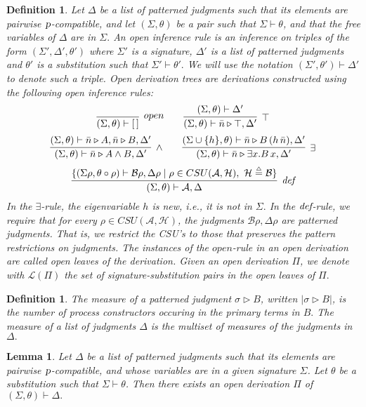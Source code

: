 \documentclass{acmtrans2m}
\newenvironment{definition}{\begin{define} \rm}{\end{define}}
\newtheorem{define}[theorem]{Definition}
\newtheorem{lemma}[theorem]{Lemma}
\newcommand{\ie}{{\em i.e.}}
\def\Ascr{{\mathcal A}}
\def\Bscr{{\mathcal B}}
\def\Hscr{{\mathcal H}}
\def\Lscr{{\mathcal L}}
\newcommand{\Judg}[2]{#1\triangleright#2}
\newcommand{\defeq}{\mathrel{\stackrel{{\scriptscriptstyle\triangle}}{=}}}
\newcommand{\proc}{\hbox{\sl p}}
\begin{document}
\begin{definition}
\label{def:patterned-judgment}
Let $\Delta$ be a list of patterned judgments such that its elements are
pairwise $\proc$-compatible, and let $(\Sigma,\theta)$ be a pair 
such that $\Sigma \vdash \theta$, and that the free variables of $\Delta$ are in $\Sigma.$
An {\em open inference rule} is an inference on triples of the form
$(\Sigma', \Delta', \theta')$ where $\Sigma'$ is a signature, $\Delta'$ is a list of patterned
judgments and $\theta'$ is a substitution such that $\Sigma' \vdash \theta'.$
We will use the notation $(\Sigma',\theta') \vdash \Delta'$ to denote such a triple.
{\em Open derivation trees} are derivations constructed using 
the following open inference rules:
$$
\infer[open]
{(\Sigma, \theta) \vdash [\,] }
{}
\qquad
\infer[\top]
{(\Sigma, \theta) \vdash \Judg{\bar n}{\top}, \Delta'}
{(\Sigma, \theta) \vdash \Delta'}
$$
$$
\infer[\land]
{(\Sigma,\theta) \vdash \Judg{\bar n} {A \land B}, \Delta'}
{(\Sigma,\theta) \vdash \Judg{\bar n} A, \Judg{\bar n} B, \Delta'}
\qquad
\infer[\exists]
{(\Sigma, \theta) \vdash \Judg{\bar n} {\exists x.B\,x}, \Delta' }
{(\Sigma \cup \{h\}, \theta) \vdash \Judg{\bar n} {B\,(h\,\bar n)}, \Delta'}
$$
$$
\infer[\defrule]
{(\Sigma, \theta) \vdash \Ascr, \Delta}
{
\{(\Sigma\rho, \theta \circ \rho) \vdash \Bscr \rho, \Delta\rho \mid \rho \in CSU(\Ascr,\Hscr), ~ \Hscr \defeq \Bscr \}
}
$$
In the $\exists$-rule, the eigenvariable $h$ is new, \ie, it is not in $\Sigma.$
In the $\mbox{\it def}$-rule, we require that for every $\rho \in CSU(\Ascr,\Hscr)$,
the judgments $\Bscr \rho, \Delta \rho$ are patterned judgments. 
That is, we restrict the CSU's to those that preserves the pattern
restrictions on judgments.
The instances of the $open$-rule in an open derivation are 
called {\em open leaves} of the derivation. 
Given an open derivation $\Pi$, we denote with $\Lscr(\Pi)$ the set of 
signature-substitution pairs in the open leaves of $\Pi.$ 
\end{definition}

\begin{definition}
The measure of a patterned judgment $\Judg{\sigma}{B}$,
written $|\Judg{\sigma}{B}|$, is the
number of process constructors occuring in the primary terms in $B.$
The measure of a list of judgments $\Delta$ is the multiset of
measures of the judgments in $\Delta.$
\end{definition}


\begin{lemma}
\label{lm:open-drv-exists}
Let $\Delta$ be a list of patterned judgments such that its elements are
pairwise $\proc$-compatible, and whose variables
are in a given signature $\Sigma$. Let $\theta$ be a substitution such that
$\Sigma \vdash \theta$. Then there exists an open derivation $\Pi$ of $(\Sigma, \theta) \vdash \Delta.$ 
\end{lemma}
\end{document}
